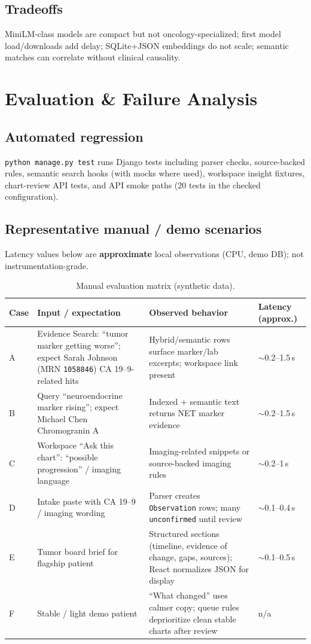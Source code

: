 \documentclass[11pt]{article}
\begin{document}
\subsection{Tradeoffs}
MiniLM-class models are compact but not oncology-specialized; first model load/downloads add delay; SQLite+JSON embeddings do not scale; semantic matches can correlate without clinical causality.

\section{Evaluation \& Failure Analysis}

\subsection{Automated regression}
\texttt{python manage.py test} runs Django tests including parser checks, source-backed rules, semantic search hooks (with mocks where used), workspace insight fixtures, chart-review API tests, and API smoke paths (20 tests in the checked configuration).

\subsection{Representative manual / demo scenarios}
Latency values below are \textbf{approximate} local observations (CPU, demo DB); not instrumentation-grade.

\begin{table}[h]
\centering
\small
\begin{tabular}{@{}p{2.2cm}p{3.8cm}p{3cm}p{1.8cm}@{}}
\toprule
\textbf{Case} & \textbf{Input / expectation} & \textbf{Observed behavior} & \textbf{Latency (approx.)} \\
\midrule
A & Evidence Search: ``tumor marker getting worse''; expect Sarah Johnson (MRN \texttt{1058846}) CA 19--9-related hits & Hybrid/semantic rows surface marker/lab excerpts; workspace link present & $\sim$0.2--1.5\,s \\
B & Query ``neuroendocrine marker rising''; expect Michael Chen Chromogranin A & Indexed + semantic text returns NET marker evidence & $\sim$0.2--1.5\,s \\
C & Workspace ``Ask this chart'': ``possible progression'' / imaging language & Imaging-related snippets or source-backed imaging rules & $\sim$0.2--1\,s \\
D & Intake paste with CA 19--9 / imaging wording & Parser creates \texttt{Observation} rows; many \texttt{unconfirmed} until review & $\sim$0.1--0.4\,s \\
E & Tumor board brief for flagship patient & Structured sections (timeline, evidence of change, gaps, sources); React normalizes JSON for display & $\sim$0.1--0.5\,s \\
F & Stable / light demo patient & ``What changed'' uses calmer copy; queue rules deprioritize clean stable charts after review & n/a \\
\bottomrule
\end{tabular}
\caption{Manual evaluation matrix (synthetic data).}
\end{table}
\end{document}
